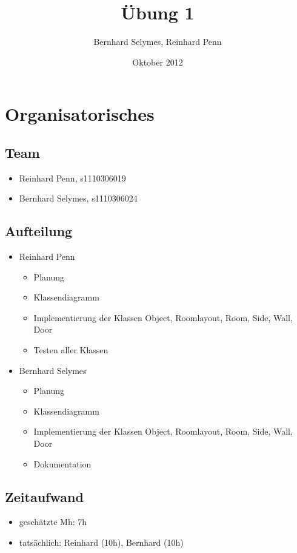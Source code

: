 \documentclass[12pt,a4paper]{article}
\begin{document}
\title{Übung 1}
\author{Bernhard Selymes, Reinhard Penn}
\date{Oktober 2012}

\normalsize

\newcommand{\CodePath}{../RoomLayout/RoomLayout/}

\section{Organisatorisches}

\subsection{Team}
	\begin {itemize} 
		\item Reinhard Penn, s1110306019 
		\item Bernhard Selymes, s1110306024
	\end {itemize}

\subsection{Aufteilung}
	\begin {itemize} 
		\item Reinhard Penn
			\begin {itemize}
				\item Planung
				\item Klassendiagramm
				\item Implementierung der Klassen Object, Roomlayout, Room, Side, Wall, Door
				\item Testen aller Klassen		
			\end {itemize}
		\item Bernhard Selymes
			\begin {itemize}
				\item Planung
				\item Klassendiagramm
				\item Implementierung der Klassen Object, Roomlayout, Room, Side, Wall, Door
				\item Dokumentation				
			\end {itemize}
	\end {itemize}


\subsection{Zeitaufwand}
	\begin {itemize}
		\item geschätzte Mh: 7h
		\item tatsächlich: Reinhard (10h), Bernhard  (10h)

	\end {itemize}
\end{document}
